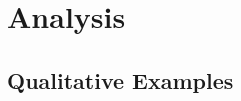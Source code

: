 %

\section{Analysis}
\label{sec:analysis}


\subsection{Qualitative Examples}
\label{subsec:analysis_qual}

